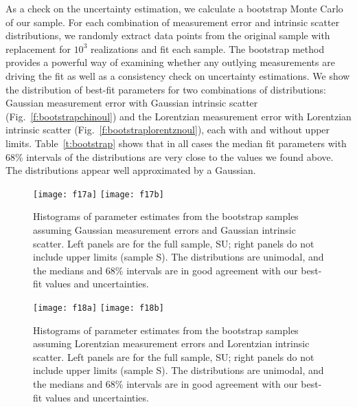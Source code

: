 \documentclass[twosided,letterpaper,numberedappendix]{emulateapj}
\begin{document}
\label{bootstrap}
As a check on the uncertainty estimation, we calculate a bootstrap
Monte Carlo of our sample.  For each combination of measurement error
and intrinsic scatter distributions, we randomly extract data points
from the original sample with replacement for $10^3$ realizations and
fit each sample.  The bootstrap method provides a powerful way of
examining whether any outlying measurements are driving the fit as
well as a consistency check on uncertainty estimations.  We show the
distribution of best-fit parameters for two combinations of
distributions: Gaussian measurement error with Gaussian intrinsic
scatter (Fig.~\ref{f:bootstrapchinoul}) and the Lorentzian measurement
error with Lorentzian intrinsic scatter
(Fig.~\ref{f:bootstraplorentznoul}), each with and without upper
limits.  Table~\ref{t:bootstrap} shows that in all cases the median
fit parameters with 68\% intervals of the distributions are very close
to the values we found above.  The distributions appear well
approximated by a Gaussian.




\begin{figure*}
\texttt{[image: f17a]}
\texttt{[image: f17b]}
\caption{Histograms of parameter estimates from the bootstrap samples
assuming Gaussian measurement errors and Gaussian intrinsic scatter.
Left panels are for the full sample, SU; right panels do not
include upper limits (sample S).  The distributions are unimodal, and
the medians and 68\% intervals are in good agreement with our best-fit
values and uncertainties.}
\label{f:bootstrapchinoul}
\label{f:bootstrapchiul}
\end{figure*}

\phantom{text}


\begin{figure*}
\texttt{[image: f18a]}
\texttt{[image: f18b]}
\caption{Histograms of parameter estimates from the bootstrap samples
assuming Lorentzian measurement errors and Lorentzian intrinsic scatter.
Left panels are for the full sample, SU; right panels do not
include upper limits (sample S).  The distributions are unimodal, and
the medians and 68\% intervals are in good agreement with our best-fit
values and uncertainties.}
\label{f:bootstraplorentznoul}
\label{f:bootstraplorentzul}
\end{figure*}
\end{document}
